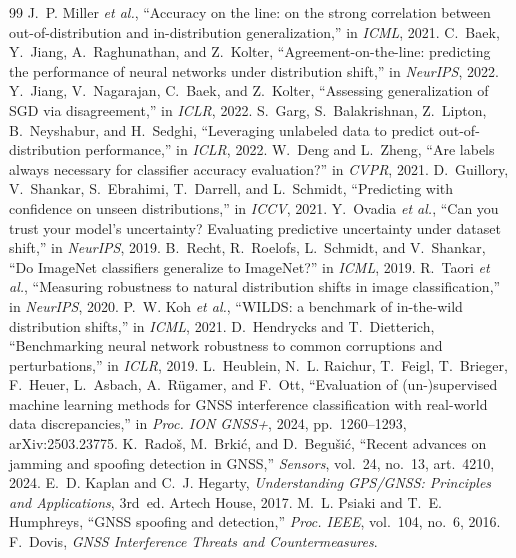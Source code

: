 \documentclass[conference]{IEEEtran}
\begin{document}
\begin{thebibliography}{99}
 J.~P. Miller \emph{et al.}, ``Accuracy on the line: on the strong
correlation between out-of-distribution and in-distribution generalization,'' in
\emph{ICML}, 2021.
 C.~Baek, Y.~Jiang, A.~Raghunathan, and Z.~Kolter,
``Agreement-on-the-line: predicting the performance of neural networks under
distribution shift,'' in \emph{NeurIPS}, 2022.
 Y.~Jiang, V.~Nagarajan, C.~Baek, and Z.~Kolter, ``Assessing
generalization of SGD via disagreement,'' in \emph{ICLR}, 2022.
 S.~Garg, S.~Balakrishnan, Z.~Lipton, B.~Neyshabur, and H.~Sedghi,
``Leveraging unlabeled data to predict out-of-distribution performance,'' in
\emph{ICLR}, 2022.
 W.~Deng and L.~Zheng, ``Are labels always necessary for
classifier accuracy evaluation?'' in \emph{CVPR}, 2021.
 D.~Guillory, V.~Shankar, S.~Ebrahimi, T.~Darrell, and L.~Schmidt,
``Predicting with confidence on unseen distributions,'' in \emph{ICCV}, 2021.
 Y.~Ovadia \emph{et al.}, ``Can you trust your model's uncertainty?
Evaluating predictive uncertainty under dataset shift,'' in \emph{NeurIPS}, 2019.
 B.~Recht, R.~Roelofs, L.~Schmidt, and V.~Shankar, ``Do ImageNet
classifiers generalize to ImageNet?'' in \emph{ICML}, 2019.
 R.~Taori \emph{et al.}, ``Measuring robustness to natural
distribution shifts in image classification,'' in \emph{NeurIPS}, 2020.
 P.~W. Koh \emph{et al.}, ``WILDS: a benchmark of in-the-wild
distribution shifts,'' in \emph{ICML}, 2021.
 D.~Hendrycks and T.~Dietterich, ``Benchmarking neural network
robustness to common corruptions and perturbations,'' in \emph{ICLR}, 2019.
 L.~Heublein, N.~L. Raichur, T.~Feigl, T.~Brieger,
F.~Heuer, L.~Asbach, A.~R\"ugamer, and F.~Ott, ``Evaluation of (un-)supervised
machine learning methods for GNSS interference classification with real-world
data discrepancies,'' in \emph{Proc. ION GNSS+}, 2024, pp.~1260--1293,
arXiv:2503.23775.
 K.~Rado\v{s}, M.~Brki\'c, and D.~Begu\v{s}i\'c, ``Recent
advances on jamming and spoofing detection in GNSS,'' \emph{Sensors}, vol.~24,
no.~13, art.~4210, 2024.
 E.~D. Kaplan and C.~J. Hegarty, \emph{Understanding GPS/GNSS:
Principles and Applications}, 3rd~ed. Artech House, 2017.
 M.~L. Psiaki and T.~E. Humphreys, ``GNSS spoofing and detection,''
\emph{Proc. IEEE}, vol.~104, no.~6, 2016.
 F.~Dovis, \emph{GNSS Interference Threats and Countermeasures}.

\end{thebibliography}
\end{document}
